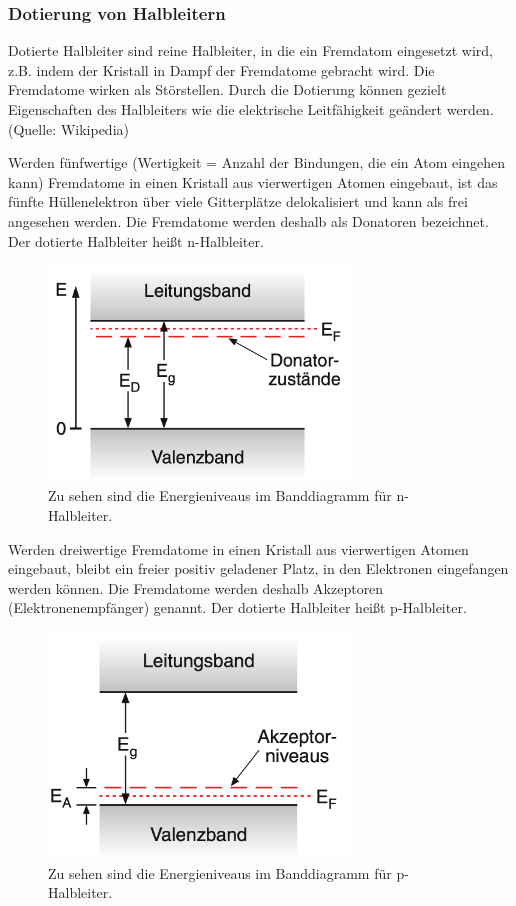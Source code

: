 \subsubsection{Dotierung von Halbleitern}
Dotierte Halbleiter sind reine Halbleiter, in die ein Fremdatom eingesetzt wird, z.B. indem der Kristall in Dampf der Fremdatome gebracht wird. Die Fremdatome wirken als Störstellen. \cite{demtroeder}
Durch die Dotierung können gezielt Eigenschaften des Halbleiters wie die elektrische Leitfähigkeit geändert werden. (Quelle: Wikipedia)


Werden fünfwertige (Wertigkeit = Anzahl der Bindungen, die ein Atom eingehen kann) Fremdatome in einen Kristall aus vierwertigen Atomen eingebaut, ist das fünfte Hüllenelektron über viele Gitterplätze delokalisiert und kann als frei angesehen werden. Die Fremdatome werden deshalb als Donatoren bezeichnet. Der dotierte Halbleiter heißt n-Halbleiter. \cite{demtroeder}
\begin{figure}
    \centering
    \includegraphics[width=8cm]{fotos/Donator.png}
    \caption{Zu sehen sind die Energieniveaus im Banddiagramm für n-Halbleiter. \cite{demtroeder}}
    \label{fig:donator}
\end{figure}


Werden dreiwertige Fremdatome in einen Kristall aus vierwertigen Atomen eingebaut, bleibt ein freier positiv geladener Platz, in den Elektronen eingefangen werden können. Die Fremdatome werden deshalb Akzeptoren (Elektronenempfänger) genannt. Der dotierte Halbleiter heißt p-Halbleiter. \cite{demtroeder} 
\begin{figure}
    \centering
    \includegraphics[width=8cm]{fotos/Akzeptor.png}
    \caption{Zu sehen sind die Energieniveaus im Banddiagramm für p-Halbleiter. \cite{demtroeder}}
    \label{fig:akzeptor}
\end{figure}

